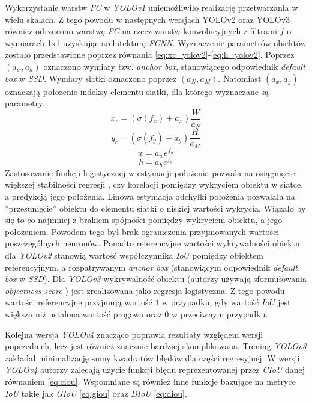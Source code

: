 Wykorzystanie warstw \emph{FC} w  \emph{YOLOv1} uniemożliwiło realizację przetwarzania w wielu skalach.
Z tego powodu w następnych wersjach YOLOv2 \cite{yolov2} oraz YOLOv3 \cite{yolov3} również odrzucono warstwę \emph{FC} na rzecz warstw konwolucyjnych z filtrami $f$ o wymiarach 1x1 uzyskując architekturę \emph{FCNN}. 
Wyznaczenie parametrów obiektów zostało przedstawione poprzez równania \eqref{eq:xc_yolov2}-\eqref{eq:h_yolov2}. Poprzez $(a_w,a_h)$ oznaczono wymiary tzw. \emph{anchor box}, stanowiącego odpowiednik \emph{default box} w \emph{SSD}. 
Wymiary siatki oznaczono poprzez $(a_N,a_M)$. Natomiast $(a_x,a_y)$ oznaczają położenie indeksy elementu siatki, dla którego wyznaczane są parametry. 
\begin{equation}
x_c = (\sigma(f_x) + a_x) \frac{W}{a_N}
\label{eq:xc_yolov2}
\end{equation}
\begin{equation}
y_c = (\sigma(f_y) + a_y) \frac{H}{a_M}
\label{eq:yc_yolov2}
\end{equation}
\begin{equation}
w = a_w e^{f_w}
\label{eq:w_yolov2}
\end{equation}
\begin{equation}
h = a_h e^{f_h}
\label{eq:h_yolov2}
\end{equation}
Zastosowanie funkcji logistycznej w estymacji położenia pozwala na osiągnięcie większej stabilności regresji \cite{yolov2}, czy korelacji pomiędzy wykryciem obiektu w siatce, a predykcją jego położenia.
Linowa estymacja odchyłki położenia pozwalała  na ''przesunięcie'' obiektu do elementu siatki o niskiej wartości wykrycia. 
Wiązało by się to co najmniej z brakiem spójności pomiędzy wykryciem obiektu, a jego położeniem.
Powodem tego był brak ograniczenia przyjmowanych wartości poszczególnych neuronów. 
Ponadto referencyjne wartości wykrywalności obiektu dla \emph{YOLOv2} stanowią wartość współczynnika $IoU$ pomiędzy obiektem referencyjnym, a rozpatrywanym \emph{anchor box} (stanowiącym odpowiednik \emph{default box} w \emph{SSD}). 
Dla \emph{YOLOv3} wykrywalność obiektu (autorzy używają sformułowania \emph{objectness score} \cite{yolov3}) jest zrealizowana jako regresja logistyczna. 
Z tego powodu wartości referencyjne przyjmują wartość $1$ w przypadku, gdy wartość $IoU$ jest większa niż ustalona wartość progowa oraz $0$ w przeciwnym przypadku. 

Kolejna wersja \emph{YOLOv4}\cite{yolov4} znacząco poprawia rezultaty względem wersji poprzednich, lecz jest również znacznie bardziej skomplikowana. Trening \emph{YOLOv3} zakładał minimalizację sumy kwadratów błędów dla części regresyjnej. W wersji \emph{YOLOv4} autorzy\cite{yolov4} zalecają użycie funkcji błędu reprezentowanej przez \emph{CIoU} \cite{dciou} danej równaniem \eqref{eq:ciou}.
Wspomniane są również inne funkcje bazujące na metryce \emph{IoU} takie jak \emph{GIoU}\cite{giou} \eqref{eq:giou} oraz \emph{DIoU} \cite{dciou} \eqref{eq:diou}.

